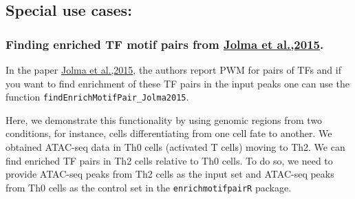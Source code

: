 \documentclass[
]{article}
\newenvironment{Shaded}{}{}
\newcommand{\AttributeTok}[1]{\textcolor[rgb]{0.49,0.56,0.16}{#1}}
\newcommand{\CommentTok}[1]{\textcolor[rgb]{0.38,0.63,0.69}{\textit{#1}}}
\newcommand{\ConstantTok}[1]{\textcolor[rgb]{0.53,0.00,0.00}{#1}}
\newcommand{\FloatTok}[1]{\textcolor[rgb]{0.25,0.63,0.44}{#1}}
\newcommand{\FunctionTok}[1]{\textcolor[rgb]{0.02,0.16,0.49}{#1}}
\newcommand{\NormalTok}[1]{#1}
\newcommand{\OtherTok}[1]{\textcolor[rgb]{0.00,0.44,0.13}{#1}}
\newcommand{\SpecialCharTok}[1]{\textcolor[rgb]{0.25,0.44,0.63}{#1}}
\newcommand{\StringTok}[1]{\textcolor[rgb]{0.25,0.44,0.63}{#1}}
\begin{document}
\hypertarget{special-use-cases}{%
\subsection{Special use cases:}\label{special-use-cases}}

\hypertarget{finding-enriched-tf-motif-pairs-from-jolma-et-al.2015.}{%
\subsubsection{\texorpdfstring{Finding enriched TF motif pairs from
\href{https://pubmed.ncbi.nlm.nih.gov/26550823/}{Jolma et
al.,2015}.}{Finding enriched TF motif pairs from Jolma et al.,2015.}}\label{finding-enriched-tf-motif-pairs-from-jolma-et-al.2015.}}

In the paper \href{https://pubmed.ncbi.nlm.nih.gov/26550823/}{Jolma et
al.,2015}, the authors report PWM for pairs of TFs and if you want to
find enrichment of these TF pairs in the input peaks one can use the
function \texttt{findEnrichMotifPair\_Jolma2015}.

Here, we demonstrate this functionality by using genomic regions from
two conditions, for instance, cells differentiating from one cell fate
to another. We obtained ATAC-seq data in Th0 cells (activated T cells)
moving to Th2. We can find enriched TF pairs in Th2 cells relative to
Th0 cells. To do so, we need to provide ATAC-seq peaks from Th2 cells as
the input set and ATAC-seq peaks from Th0 cells as the control set in
the \texttt{enrichmotifpairR} package.

\begin{Shaded}
\end{Shaded}
\end{document}
